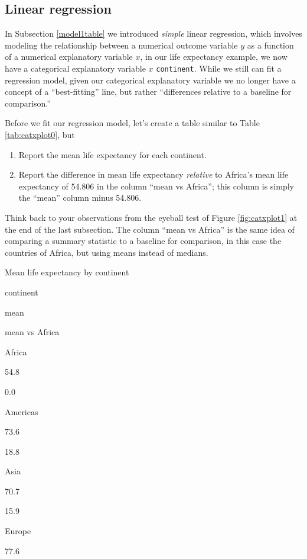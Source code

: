 \documentclass[12pt,]{krantz}
\providecommand{\tightlist}{%
  \setlength{\itemsep}{0pt}\setlength{\parskip}{0pt}}
\begin{document}
\subsection{Linear regression}\label{model2table}

In Subsection \ref{model1table} we introduced \emph{simple} linear
regression, which involves modeling the relationship between a numerical
outcome variable \(y\) as a function of a numerical explanatory variable
\(x\), in our life expectancy example, we now have a categorical
explanatory variable \(x\) \texttt{continent}. While we still can fit a
regression model, given our categorical explanatory variable we no
longer have a concept of a ``best-fitting'' line, but rather
``differences relative to a baseline for comparison.''

Before we fit our regression model, let's create a table similar to
Table \ref{tab:catxplot0}, but

\begin{enumerate}
\def\labelenumi{\arabic{enumi}.}
\tightlist
\item
  Report the mean life expectancy for each continent.
\item
  Report the difference in mean life expectancy \emph{relative} to
  Africa's mean life expectancy of 54.806 in the column ``mean vs
  Africa''; this column is simply the ``mean'' column minus 54.806.
\end{enumerate}

Think back to your observations from the eyeball test of Figure
\ref{fig:catxplot1} at the end of the last subsection. The column ``mean
vs Africa'' is the same idea of comparing a summary statistic to a
baseline for comparison, in this case the countries of Africa, but using
means instead of medians.

\label{tab:continent-mean-life-expectancies}Mean life expectancy by
continent

continent

mean

mean vs Africa

Africa

54.8

0.0

Americas

73.6

18.8

Asia

70.7

15.9

Europe

77.6
\end{document}
